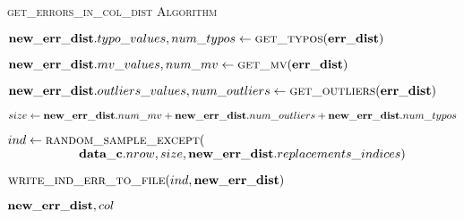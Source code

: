\begin{algorithm}[!t]
    \caption{\textsc{get\_errors\_in\_col\_dist Algorithm}}\label{alg:local_get_errors_in_col_dist}
    \begin{algorithmic}[1] 
	  
      \STATE $\mathbf{new\_err\_dist}.typo\_values, num\_typos \leftarrow \textsc{get\_typos}(\mathbf{err\_dist})$ 
	  
      \STATE $\mathbf{new\_err\_dist}.mv\_values, num\_mv \leftarrow \textsc{get\_mv}(\mathbf{err\_dist})$ 
      
      \STATE $\mathbf{new\_err\_dist}.outliers\_values, num\_outliers \leftarrow \textsc{get\_outliers}(\mathbf{err\_dist})$ 
      
      \STATE $size \leftarrow \mathbf{new\_err\_dist}.num\_mv + \mathbf{new\_err\_dist}.num\_outliers + \mathbf{new\_err\_dist}.num\_typos$ 
      
      \STATE $ind \leftarrow \textsc{random\_sample\_except}($
      \STATE $\ \ \ \ \ \ \ \ \ \ \ \ \ \ \ \ \ \mat{data\_c}.nrow, size, \mat{new\_err\_dist}.replacements\_indices)$ 
      
	  \STATE $\textsc{write\_ind\_err\_to\_file}(ind, \mathbf{new\_err\_dist})$ 
	  
      \RETURN $\mathbf{new\_err\_dist}, col$
    \end{algorithmic}
\end{algorithm}
